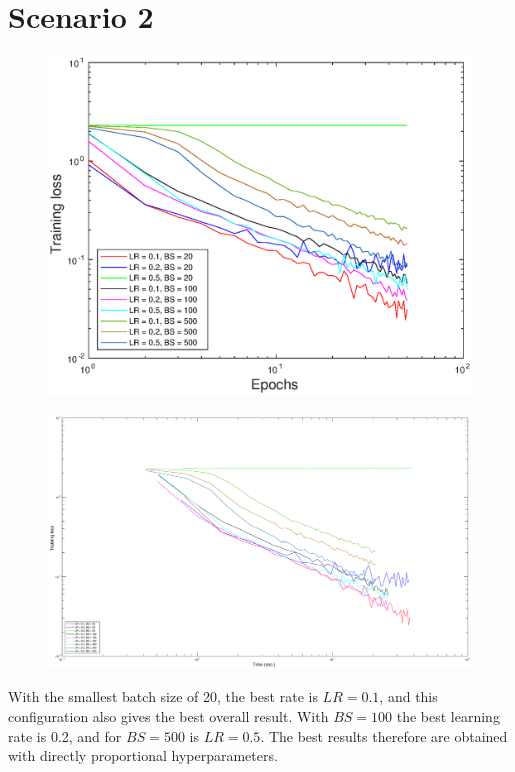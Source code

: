 \documentclass{article}
\begin{document}
\section*{Scenario 2}
	\begin{figure}[!htb]
        \centering
        \includegraphics[width=\textwidth]{figures/sc2_tr_loss}
    \end{figure}
    \begin{figure}[!htb]
        \centering
        \includegraphics[width=\textwidth]{figures/sc2_tr_loss_time}
    \end{figure}

    With the smallest batch size of 20, the best rate is $LR = 0.1$, and this configuration also gives the best overall result. With $BS = 100$ the best learning rate is 0.2, and for $BS = 500$ is $LR = 0.5$.
    The best results therefore are obtained with directly proportional hyperparameters.
    
\end{document}

